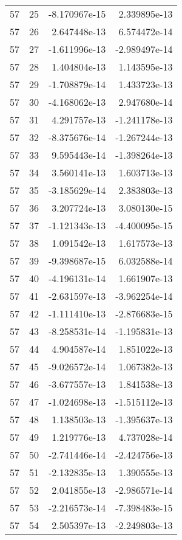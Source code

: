 \begin{tabular}{rrrr}
  57 &   25 & -8.170967e-15 &  2.339895e-13 \\
  57 &   26 &  2.647448e-13 &  6.574472e-14 \\
  57 &   27 & -1.611996e-13 & -2.989497e-14 \\
  57 &   28 &  1.404804e-13 &  1.143595e-13 \\
  57 &   29 & -1.708879e-14 &  1.433723e-13 \\
  57 &   30 & -4.168062e-13 &  2.947680e-14 \\
  57 &   31 &  4.291757e-13 & -1.241178e-13 \\
  57 &   32 & -8.375676e-14 & -1.267244e-13 \\
  57 &   33 &  9.595443e-14 & -1.398264e-13 \\
  57 &   34 &  3.560141e-13 &  1.603713e-13 \\
  57 &   35 & -3.185629e-14 &  2.383803e-13 \\
  57 &   36 &  3.207724e-13 &  3.080130e-15 \\
  57 &   37 & -1.121343e-13 & -4.400095e-15 \\
  57 &   38 &  1.091542e-13 &  1.617573e-13 \\
  57 &   39 & -9.398687e-15 &  6.032588e-14 \\
  57 &   40 & -4.196131e-14 &  1.661907e-13 \\
  57 &   41 & -2.631597e-13 & -3.962254e-14 \\
  57 &   42 & -1.111410e-13 & -2.876683e-15 \\
  57 &   43 & -8.258531e-14 & -1.195831e-13 \\
  57 &   44 &  4.904587e-14 &  1.851022e-13 \\
  57 &   45 & -9.026572e-14 &  1.067382e-13 \\
  57 &   46 & -3.677557e-13 &  1.841538e-13 \\
  57 &   47 & -1.024698e-13 & -1.515112e-13 \\
  57 &   48 &  1.138503e-13 & -1.395637e-13 \\
  57 &   49 &  1.219776e-13 &  4.737028e-14 \\
  57 &   50 & -2.741446e-14 & -2.424756e-13 \\
  57 &   51 & -2.132835e-13 &  1.390555e-13 \\
  57 &   52 &  2.041855e-13 & -2.986571e-14 \\
  57 &   53 & -2.216573e-14 & -7.398483e-15 \\
  57 &   54 &  2.505397e-13 & -2.249803e-13 \\

\end{tabular}
